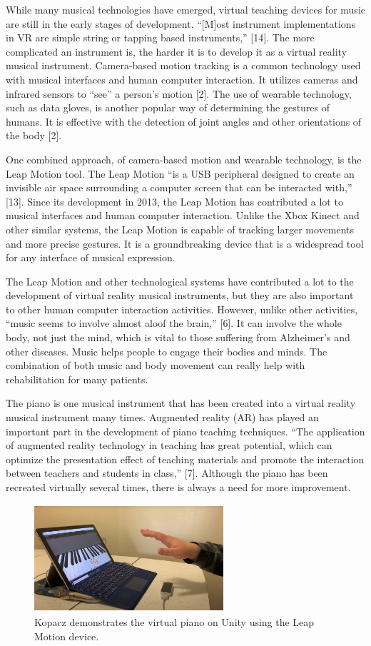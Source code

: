 \documentclass[conference,compsoc]{IEEEtran}
\begin{document}
While many musical technologies have emerged, virtual teaching devices for music are still in the early stages of development. “[M]ost instrument implementations in VR are simple string or tapping based instruments,” [14]. The more complicated an instrument is, the harder it is to develop it as a virtual reality musical instrument. Camera-based motion tracking is a common technology used with musical interfaces and human computer interaction. It utilizes cameras and infrared sensors to “see” a person’s motion [2]. The use of wearable technology, such as data gloves, is another popular way of determining the gestures of humans. It is effective with the detection of joint angles and other orientations of the body [2]. 

One combined approach, of camera-based motion and wearable technology, is the Leap Motion tool. The Leap Motion “is a USB peripheral designed to create an invisible air space surrounding a computer screen that can be interacted with,” [13]. Since its development in 2013, the Leap Motion has contributed a lot to musical interfaces and human computer interaction. Unlike the Xbox Kinect and other similar systems, the Leap Motion is capable of tracking larger movements and more precise gestures. It is a groundbreaking device that is a widespread tool for any interface of musical expression.

The Leap Motion and other technological systems have contributed a lot to the development of virtual reality musical instruments, but they are also important to other human computer interaction activities. However, unlike other activities, “music seems to involve almost aloof the brain,” [6]. It can involve the whole body, not just the mind, which is vital to those suffering from Alzheimer’s and other diseases. Music helps people to engage their bodies and minds. The combination of both music and body movement can really help with rehabilitation for many patients.

The piano is one musical instrument that has been created into a virtual reality musical instrument many times. Augmented reality (AR) has played an important part in the development of piano teaching techniques. “The application of augmented reality technology in teaching has great potential, which can optimize the presentation effect of teaching materials and promote the interaction between teachers and students in class,” [7]. Although the piano has been recreated virtually several times, there is always a need for more improvement.

\begin{figure}[h]
\centering
\includegraphics[width=7cm, height=4cm]{IEEEtran/VPhand.JPG}
\centering
\caption{Kopacz demonstrates the virtual piano on Unity using the Leap Motion device.}
\end{figure}
\end{document}
